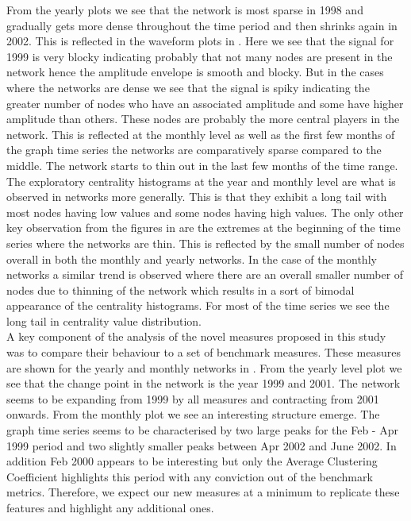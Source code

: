 From the yearly plots we see that the network is most sparse in 1998 and gradually gets more dense throughout the time period and then shrinks again in 2002. This is reflected in the waveform plots in  . Here we see that the signal for 1999 is very blocky indicating probably that not many nodes are present in the network hence the amplitude envelope is smooth and blocky. But in the cases where the networks are dense we see that the signal is spiky indicating the greater number of nodes who have an associated amplitude and some have higher amplitude than others. These nodes are probably the more central players in the network. This is reflected at the monthly level as well as the first few months of the graph time series the networks are comparatively sparse compared to the middle. The network starts to thin out in the last few months of the time range. \\

The exploratory centrality histograms at the year and monthly level are what is observed in networks more generally. This is that they exhibit a long tail with most nodes having low values and some nodes having high values. The only other key observation from the figures in  are the extremes at the beginning of the time series where the networks are thin. This is reflected by the small number of nodes overall in both the monthly and yearly networks. In the case of the monthly networks a similar trend is observed where there are an overall smaller number of nodes due to thinning of the network which results in a sort of bimodal appearance of the centrality histograms. For most of the time series we see the long tail in centrality value distribution. \\

A key component of the analysis of the novel measures proposed in this study was to compare their behaviour to a set of benchmark measures. These measures are shown for the yearly and monthly networks in . From the yearly level plot  we see that the change point in the network is the year 1999 and 2001. The network seems to be expanding from 1999 by all measures and contracting from 2001 onwards. From the monthly plot  we see an interesting structure emerge. The graph time series seems to be characterised by two large peaks for the Feb - Apr 1999 period and two slightly smaller peaks between Apr 2002 and June 2002. In addition Feb 2000 appears to be interesting but only the Average Clustering Coefficient highlights this period with any conviction out of the benchmark metrics. Therefore, we expect our new measures at a minimum to replicate these features and highlight any additional ones. \\


